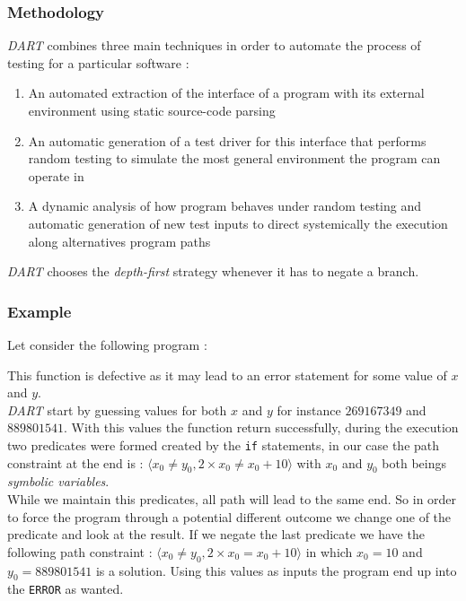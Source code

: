 \documentclass[11pt]{article}
\begin{document}
    	\subsubsection{Methodology}
	    	\emph{DART} combines three main techniques 	    	\cite{godefroid2005dart} in order to automate the process of testing for a particular software :
	    	\begin{enumerate}
	    		\item An automated extraction of the interface of a program with its external environment using static source-code parsing
	    		\item An automatic generation of a test driver for this interface that performs random testing to simulate the most general environment the program can operate in
	    		\item A dynamic analysis of how program behaves under random testing and automatic generation of new test inputs to direct systemically the execution along alternatives program paths
	    	\end{enumerate}

			\emph{DART} chooses the \emph{depth-first} strategy whenever it has to negate a branch.

	    \subsubsection{Example}
		    Let consider the following program :

		    \begin{algorithm}


		    \end{algorithm}

	    	This function is defective as it may lead to an error statement for some value of $x$ and $y$.\\
	    	\emph{DART} start by guessing values for both $x$ and $y$ for instance $269167349$ and $889801541$. With this values the function return  successfully, during the execution two predicates were formed created by the \texttt{if} statements, in our case the path constraint at the end is : $\langle x_0 \neq y_0, 2 \times x_0 \neq x_0 + 10 \rangle$ with $x_0$ and $y_0$ both beings \emph{symbolic variables}.\\ %
	    	While we maintain this predicates, all path will lead to the same end. So in order to force  the program through a potential different outcome we change one of the predicate and look at the result. If we negate the last predicate we have the following path constraint : $\langle x_0 \neq y_0, 2 \times x_0 = x_0 + 10 \rangle$ in which $x_0=10$ and $y_0=889801541$ is a solution. Using this values as inputs the program end up into the \texttt{ERROR} as wanted.
\end{document}
